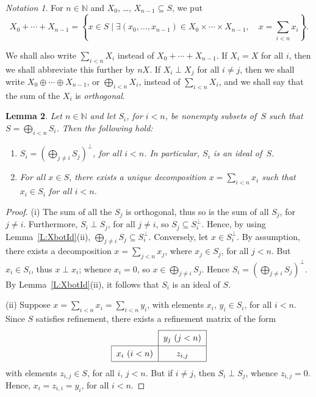 \documentclass[psamsfonts,reqno]{memo-l}
\theoremstyle{plain}
\newtheorem{lemma}{Lemma}[section]
\theoremstyle{definition}
\theoremstyle{remark}
\newtheorem{notation}[lemma]{Notation}
\numberwithin{equation}{section}
\newcommand{\tvi}{\vrule height 12pt depth 6pt width 0pt}
\newcommand{\NN}{\mathbb{N}}
\newcommand{\Set}[1]{\left\{#1\right\}}
\newcommand{\Setm}[2]{\Set{#1\mid#2}}
\begin{document}
\begin{notation}\label{Not:SumSubsets}
For $n\in\NN$ and $X_0$, \dots, $X_{n-1}\subseteq S$, we put
   \[
   X_0+\cdots+X_{n-1}=\Setm{x\in S}
   {\exists(x_0,\ldots,x_{n-1})\in X_0\times\cdots\times X_{n-1},\quad
   x=\sum_{i<n}x_i}.
   \]
\end{notation}

We shall also write $\sum_{i<n}X_i$ instead of $X_0+\cdots+X_{n-1}$.
If $X_i=X$ for all $i$, then we shall abbreviate this further by $nX$.
If $X_i\perp X_j$ for all $i\neq j$, then we shall write
$X_0\oplus\cdots\oplus X_{n-1}$, or $\bigoplus_{i<n}X_i$, instead of
$\sum_{i<n}X_i$, and we shall say that the sum of the $X_i$ is
\emph{orthogonal}.

\begin{lemma}\label{L:OplusId}
Let $n\in\NN$ and let $S_i$, for $i<n$, be nonempty subsets of~$S$ such that
$S=\bigoplus_{i<n}S_i$. Then the following hold:

\begin{enumerate}

\item $S_i=\left(\bigoplus_{j\neq i}S_j\right)^\bot$, for all $i<n$.
In particular, $S_i$ is an ideal of~$S$.

\item For all $x\in S$, there exists a unique decomposition
$x=\sum_{i<n}x_i$ such that $x_i\in S_i$ for all $i<n$.

\end{enumerate}

\end{lemma}

\begin{proof}
(i) The sum of all the $S_j$ is orthogonal, thus so is the sum of all $S_j$,
for $j\neq i$. Furthermore, $S_i\perp S_j$, for all $j\neq i$, so
$S_j\subseteq S_i^\bot$. Hence, by using Lemma~\ref{L:XbotId}(ii),
$\bigoplus_{j\neq i}S_j\subseteq S_i^\bot$. Conversely, let $x\in S_i^\bot$.
By assumption, there exists a decomposition $x=\sum_{j<n}x_j$, where
$x_j\in S_j$, for all $j<n$. But $x_i\in S_i$, thus $x\perp x_i$; whence
$x_i=0$, so $x\in\bigoplus_{j\neq i}S_j$. Hence
$S_i=\left(\bigoplus_{j\neq i}S_j\right)^\bot$. By Lemma~\ref{L:XbotId}(ii),
it follows that $S_i$ is an ideal of $S$.

(ii) Suppose $x=\sum_{i<n}x_i=\sum_{i<n}y_i$, with elements
$x_i$, $y_i\in S_i$, for all $i<n$. Since $S$ satisfies refinement, there
exists a refinement matrix of the form
   \[
   \begin{tabular}{|c|c|}
   \cline{2-2}
   \multicolumn{1}{l|}{} & $y_j\ (j<n)$\tvi\\
   \hline
   $x_i\ (i<n)$ & $z_{i,j}$\tvi\\
   \hline
   \end{tabular}
   \]
with elements $z_{i,j}\in S$, for all $i$, $j<n$. But if $i\neq j$, then
$S_i\perp S_j$, whence $z_{i,j}=0$. Hence, $x_i=z_{i,i}=y_i$, for all $i<n$.
\end{proof}
\end{document}
